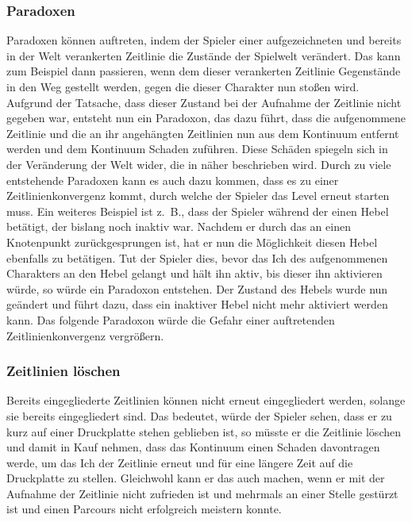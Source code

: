 \subsubsection{Paradoxen} 
Paradoxen können auftreten, indem der Spieler einer aufgezeichneten und bereits in der Welt verankerten Zeitlinie die Zustände der Spielwelt verändert. Das kann zum Beispiel dann passieren, wenn dem  dieser verankerten Zeitlinie Gegenstände in den Weg gestellt werden, gegen die dieser Charakter nun stoßen wird. Aufgrund der Tatsache, dass dieser Zustand bei der Aufnahme der Zeitlinie nicht gegeben war, entsteht nun ein Paradoxon, das dazu führt, dass die aufgenommene Zeitlinie und die an ihr angehängten Zeitlinien nun aus dem Kontinuum entfernt werden und dem Kontinuum Schaden zuführen. Diese Schäden spiegeln sich in der Veränderung der Welt wider, die in  näher beschrieben wird. Durch zu viele entstehende Paradoxen kann es auch dazu kommen, dass es zu einer Zeitlinienkonvergenz kommt, durch welche der Spieler das Level erneut starten muss. Ein weiteres Beispiel ist z. B., dass der Spieler während der  einen Hebel betätigt, der bislang noch inaktiv war. Nachdem er durch das  an einen Knotenpunkt zurückgesprungen ist, hat er nun die Möglichkeit diesen Hebel ebenfalls zu betätigen. Tut der Spieler dies, bevor das Ich des aufgenommenen Charakters an den Hebel gelangt und hält ihn aktiv, bis dieser ihn aktivieren würde, so würde ein Paradoxon entstehen. Der Zustand des Hebels wurde nun geändert und führt dazu, dass ein inaktiver Hebel nicht mehr aktiviert werden kann. Das folgende Paradoxon würde die Gefahr einer auftretenden Zeitlinienkonvergenz vergrößern.

\subsubsection{Zeitlinien löschen}
Bereits eingegliederte Zeitlinien können nicht erneut eingegliedert werden, solange sie bereits eingegliedert sind. Das bedeutet, würde der Spieler sehen, dass er zu kurz auf einer Druckplatte stehen geblieben ist, so müsste er die Zeitlinie löschen und damit in Kauf nehmen, dass das Kontinuum einen Schaden davontragen werde, um das Ich der Zeitlinie erneut und für eine längere Zeit auf die Druckplatte zu stellen. Gleichwohl kann er das auch machen, wenn er mit der Aufnahme der Zeitlinie nicht zufrieden ist und mehrmals an einer Stelle gestürzt ist und einen Parcours nicht erfolgreich meistern konnte.

